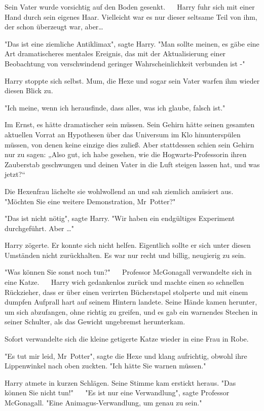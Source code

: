 {Sein Vater wurde vorsichtig auf den Boden gesenkt. ~ ~Harry fuhr sich mit einer Hand durch sein eigenes Haar. Vielleicht war es nur dieser seltsame Teil von ihm, der schon überzeugt war, aber…

"Das ist eine ziemliche Antiklimax", sagte Harry. "Man sollte meinen, es gäbe eine Art dramatischeres mentales Ereignis, das mit der Aktualisierung einer Beobachtung von verschwindend geringer Wahrscheinlichkeit verbunden ist -"

Harry stoppte sich selbst. Mum, die Hexe und sogar sein Vater warfen ihm wieder diesen Blick zu.

"Ich meine, wenn ich herausfinde, dass alles, was ich glaube, falsch ist." ~ ~

Im Ernst, es hätte dramatischer sein müssen. Sein Gehirn hätte seinen gesamten aktuellen Vorrat an Hypothesen über das Universum im Klo hinunterspülen müssen, von denen keine einzige dies zuließ. Aber stattdessen schien sein Gehirn nur zu sagen: „Also gut, ich habe gesehen, wie die Hogwarts-Professorin ihren Zauberstab geschwungen und deinen Vater in die Luft steigen lassen hat, und was jetzt?“ ~ ~

Die Hexenfrau lächelte sie wohlwollend an und sah ziemlich amüsiert aus. "Möchten Sie eine weitere Demonstration, Mr~Potter?" ~ ~

"Das ist nicht nötig", sagte Harry. "Wir haben ein endgültiges Experiment durchgeführt. Aber …"

Harry zögerte. Er konnte sich nicht helfen. Eigentlich sollte er sich unter diesen Umständen nicht zurückhalten. Es war nur recht und billig, neugierig zu sein.

"Was können Sie sonst noch tun?" ~ ~Professor McGonagall verwandelte sich in eine Katze. ~ ~Harry wich gedankenlos zurück und machte einen so schnellen Rückzieher, dass er über einen verirrten Bücherstapel stolperte und mit einem dumpfen Aufprall hart auf seinem Hintern landete. Seine Hände kamen herunter, um sich abzufangen, ohne richtig zu greifen, und es gab ein warnendes Stechen in seiner Schulter, als das Gewicht ungebremst herunterkam. ~ ~

Sofort verwandelte sich die kleine getigerte Katze wieder in eine Frau in Robe.

"Es tut mir leid, Mr~Potter", sagte die Hexe und klang aufrichtig, obwohl ihre Lippenwinkel nach oben zuckten. "Ich hätte Sie warnen müssen." ~ ~

Harry atmete in kurzen Schlägen. Seine Stimme kam erstickt heraus. "Das können Sie nicht tun!" ~ ~"Es ist nur eine Verwandlung", sagte Professor McGonagall. "Eine Animagus-Verwandlung, um genau zu sein." ~ ~

}

